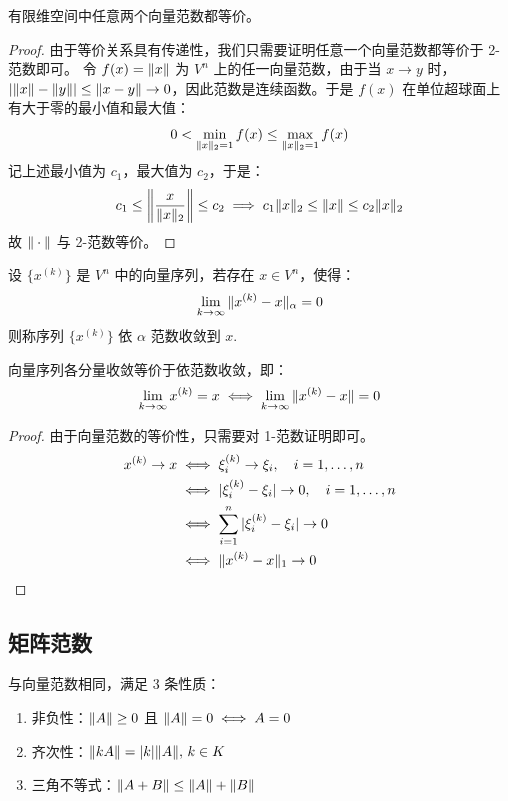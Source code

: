 \begin{theorem}
有限维空间中任意两个向量范数都等价。
\end{theorem}
\begin{proof}
由于等价关系具有传递性，我们只需要证明任意一个向量范数都等价于 2-范数即可。
令 $f(x)=\Vert x\Vert$ 为 $V^n$ 上的任一向量范数，由于当 $x\to y$ 时，$\left|\Vert x\Vert-\Vert y\Vert\right|\leq \Vert x-y\Vert\to 0$，因此范数是连续函数。于是 $f(x)$ 在单位超球面上有大于零的最小值和最大值：
\[
    0<\min_{\Vert x\Vert_2=1}f(x)\leq \max_{\Vert x\Vert_2=1}f(x)
\]
记上述最小值为 $c_1$，最大值为 $c_2$，于是：
\[
    c_1\leq \left\Vert\frac{x}{\Vert x\Vert_2}\right\Vert\leq c_2\implies c_1\Vert x\Vert_2\leq\Vert x\Vert\leq c_2\Vert x\Vert_2
\]
故 $\Vert\cdot\Vert$ 与 2-范数等价。
\end{proof}

\begin{definition}[依范数收敛]
设 $\{x^{(k)}\}$ 是 $V^n$ 中的向量序列，若存在 $x\in V^n$，使得：
\[
    \lim_{k\to\infty} \Vert x^{(k)}-x\Vert_\alpha=0
\]
则称序列 $\{x^{(k)}\}$ 依 $\alpha$ 范数收敛到 $x$.
\end{definition}

\begin{theorem}
向量序列各分量收敛等价于依范数收敛，即：
\[
    \lim_{k\to\infty} x^{(k)}=x\iff\lim_{k\to\infty} \Vert x^{(k)}-x\Vert=0
\]
\end{theorem}
\begin{proof}
由于向量范数的等价性，只需要对 1-范数证明即可。
\begin{align*}
    x^{(k)}\to x&\iff \xi_i^{(k)}\to\xi_i,\quad i=1,\ldots,n\\
    &\iff |\xi_i^{(k)}-\xi_i|\to 0,\quad i=1,\ldots,n\\
    &\iff \sum_{i=1}^n|\xi_i^{(k)}-\xi_i|\to 0\\
    &\iff \Vert x^{(k)}-x\Vert_1\to0
\end{align*}
\end{proof}

\subsection{矩阵范数}

\begin{definition}[广义矩阵范数]
与向量范数相同，满足 3 条性质：
\begin{enumerate}[series=matrix-norm]
    \item 非负性：$\Vert A\Vert\geq 0$ 且 $\Vert A\Vert=0\iff A=0$
    \item 齐次性：$\Vert kA\Vert=|k|\Vert A\Vert,\,k\in K$
    \item 三角不等式：$\Vert A+B\Vert\leq\Vert A\Vert+\Vert B\Vert$
\end{enumerate}
\end{definition}

